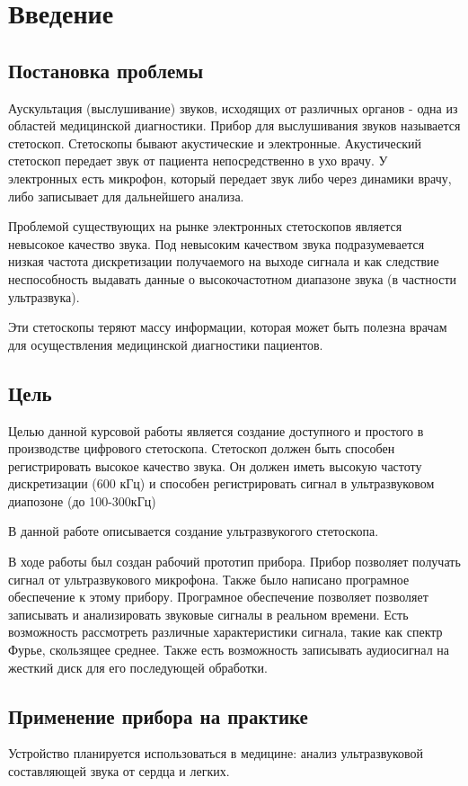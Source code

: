 \tableofcontents
\newpage 
\section{Введение}
\subsection{Постановка проблемы}
Аускультация (выслушивание) звуков, исходящих от различных органов - одна из областей медицинской диагностики. Прибор для выслушивания звуков называется стетоскоп. Стетоскопы бывают акустические и электронные. Акустический стетоскоп передает звук от пациента непосредственно в ухо врачу. У электронных есть микрофон, который передает звук либо через динамики врачу, либо записывает для дальнейшего анализа.

Проблемой существующих на рынке электронных стетоскопов является невысокое качество звука. Под невысоким качеством звука подразумевается низкая частота дискретизации получаемого на выходе сигнала и как следствие неспособность выдавать данные о высокочастотном диапазоне звука (в частности ультразвука).

Эти стетоскопы теряют массу информации, которая может быть полезна врачам для осуществления медицинской диагностики пациентов.

\subsection{Цель}
Целью данной курсовой работы является создание доступного и простого в производстве цифрового стетоскопа. Стетоскоп должен быть способен регистрировать высокое качество звука. Он должен иметь высокую частоту дискретизации (600 кГц) и способен регистрировать сигнал в ультразвуковом диапозоне (до 100-300кГц)

В данной работе описывается создание ультразвукогого стетоскопа.

В ходе работы был создан рабочий прототип прибора. Прибор позволяет получать сигнал от ультразвукового микрофона. Также было написано програмное обеспечение к этому прибору. Програмное обеспечение позволяет позволяет записывать и анализировать звуковые сигналы в реальном времени. Есть возможность рассмотреть различные характеристики сигнала, такие как спектр Фурье, скользящее среднее. Также есть возможность записывать аудиосигнал на жесткий диск для его последующей обработки.

\subsection{Применение прибора на практике}
Устройство планируется использоваться в медицине: анализ ультразвуковой составляющей звука от сердца и легких.


